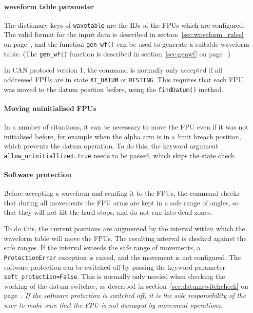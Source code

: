 \documentclass[11pt,a4paper]{scrartcl}
\begin{document}
\paragraph{waveform table parameter}

The dictionary keys of \texttt{wavetable} are the IDs of the FPUs
which are configured. The valid format for the input data is described
in section~\ref{sec:waveform_rules} on
page~\pageref{sec:waveform_rules}, and the function \texttt{gen\_wf()}
can be used to generate a suitable waveform table. (The
\texttt{gen\_wf()} function is described in section~\ref{sec:genwf} on
page~\pageref{sec:genwf}.)

In CAN protocol version 1, the command is normally only accepted if
all addressed FPUs are in state \texttt{AT\_DATUM} or \texttt{RESTING}.
This requires that each FPU was moved to the datum position before, using
the \texttt{findDatum()} method.

\paragraph{Moving uninitialised FPUs}

In a number of situations, it can be necessary to move the FPU even if
it was not initialised before, for example when the alpha arm is in a
limit breach position, which prevents the datum operation. To do this,
the keyword argument \texttt{allow\_uninitiallized=True} needs to be passed,
which skips the state check.

\paragraph{Software protection}
 Before accepting a waveform and sending it
to the FPUs, the command checks that during all movements the FPU arms
are kept in a safe range of angles, so that they will not hit the hard
stops, and do not run into dead zones.

To do this, the current positions are augmented by the interval within
which the waveform table will move the FPUs. The resulting interval is
checked against the safe ranges. If the interval exceeds the safe
range of movements, a \texttt{ProtectionError} exception is raised,
and the movement is not configured.  The software protection can be
switched off by passing the keyword parameter
\texttt{soft\_protection=False}. This is normally only needed when
checking the working of the datum switches, as described in
section~\ref{sec:datumswitchcheck} on
page~\pageref{sec:datumswitchcheck}. \emph{If the software protection
  is switched off, it is the sole responsibility of the user to make
  sure that the FPU is not damaged by movement operations.}
\end{document}
